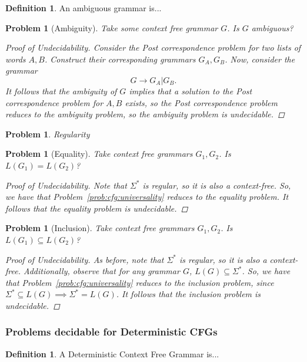 \documentclass[psamsfonts]{amsart}
\newtheorem{prob}[thm]{Problem}
\theoremstyle{definition}
\newtheorem{defn}[thm]{Definition}
\theoremstyle{remark}
\numberwithin{equation}{section}
\begin{document}
\begin{defn}
An ambiguous grammar is...
\end{defn}

\begin{prob}[Ambiguity]
  Take some context free grammar $G$. Is $G$ ambiguous?
  \begin{proof}[Proof of Undecidability]
    Consider the Post correspondence problem for two lists of words
    $A,B$. Construct their corresponding grammars $G_A,G_B$. Now, consider the
    grammar
    \[
      G \rightarrow G_A \vert G_B.
    \]
    It follows that the ambiguity of $G$ implies that a solution to the Post
    correspondence problem for $A,B$ exists, so the Post correspondence problem
    reduces to the ambiguity problem, so the ambiguity problem is undecidable.
  \end{proof}
\end{prob}
\cite{greibach66:_unsol_recog_linear_contex_free_languag}
\cite{Hopcroft1969}
\begin{prob}
  Regularity
\end{prob}
\begin{prob}[Equality]
  Take context free grammars $G_1,G_2$. Is $L(G_1)=L(G_2)$?
  \begin{proof}[Proof of Undecidability]
    Note that $\Sigma^*$ is regular, so it is also a context-free. So,
    we have that Problem~\ref{prob:cfg:universality} reduces to the equality
    problem. It follows that the equality problem is undecidable.
  \end{proof}
\end{prob}
\begin{prob}[Inclusion]
  Take context free grammars $G_1,G_2$. Is $L(G_1)\subseteq L(G_2)$?
  \begin{proof}[Proof of Undecidability]
    As before, note that $\Sigma^*$ is regular, so it is also a
    context-free. Additionally, observe that for any grammar $G$, $L(G)\subseteq
    \Sigma^*$. So,
    we have that Problem~\ref{prob:cfg:universality} reduces to the inclusion
    problem, since $\Sigma^* \subseteq L(G) \implies \Sigma^* = L(G)$. It follows that the inclusion problem is undecidable.
  \end{proof}
\end{prob}

\subsubsection{Problems decidable for Deterministic CFGs}
\cite{ginsburg65:_deter}
\begin{defn}
  A Deterministic Context Free Grammar is...
  \cite{sipser13:_introd_theor_comput}
\end{defn}
\end{document}
